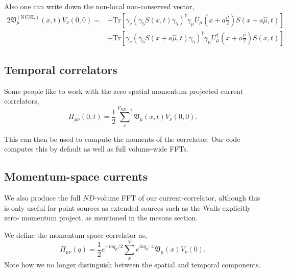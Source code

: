 Also one can write down the non-local non-conserved vector,
\begin{equation}
\begin{aligned}
2\mathfrak{V}_\mu^{(\text{NCNL})}(x,t)V_\nu(0,0) =& 
+\text{Tr}\left[ \gamma_\nu \left( \gamma_5 S(x,t) \gamma_5 \right)^{\dagger} \gamma_\mu U_\mu\left( x + a\frac{\hat{\mu}}{2}\right) S(x+a\hat{\mu},t) \right] \\
&+ \text{Tr}\left[ \gamma_\nu \left( \gamma_5 S(x+a\hat{\mu},t) \gamma_5 \right)^{\dagger} \gamma_\mu U_\mu^{\dagger}\left( x + a\frac{\hat{\mu}}{2}\right) S(x,t) \right].
\end{aligned}
\end{equation}

\subsection{Temporal correlators}

Some people like to work with the zero spatial momentum projected current correlators,
\begin{equation}
\Pi_{\mu\nu}(0,t) = \frac{1}{2}\sum_{x}^{V_{ND-1}} \mathfrak{V}_\mu(x,t)V_\nu(0,0).
\end{equation}

This can then be used to compute the moments of the correlator. Our code computes this
by default as well as full volume-wide FFTs.

\subsection{Momentum-space currents}

We also produce the full $ND$-volume FFT of our current-correlator, although this is
only useful for point sources as extended sources such as the Walls explicitly zero-
momentum project, as mentioned in the mesons section.

We define the momentum-space correlator as,
\begin{equation}
\Pi_{\mu\nu}(q) = \frac{1}{2}e^{-iaq_\mu/2}\sum_{x}^{V}e^{iaq_\mu \cdot x} \mathfrak{V}_\mu(x)V_\nu(0).
\end{equation}
Note how we no longer distinguish between the spatial and temporal components.

